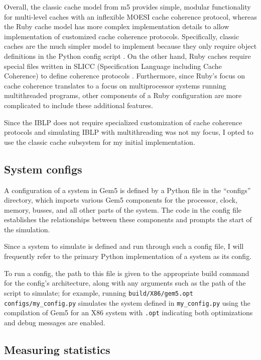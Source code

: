 \documentclass[12pt,twoside]{reedthesis}
\begin{document}
	Overall, the classic cache model from m5 provides simple, modular functionality for multi-level caches with an inflexible MOESI cache coherence protocol, whereas the Ruby cache model has more complex implementation details to allow implementation of customized cache coherence protocols. Specifically, classic caches are the much simpler model to implement because they only require object definitions in the Python config script \cite{gem5-tutorial}. On the other hand, Ruby caches require special files written in SLICC (Specification Language including Cache Coherence) to define coherence protocols \cite{gem5-ruby}. Furthermore, since Ruby's focus on cache coherence translates to a focus on multiprocessor systems running multithreaded programs, other components of a Ruby configuration are more complicated to include these additional features.

	Since the IBLP does not require specialized customization of cache coherence protocols and simulating IBLP with multithreading was not my focus, I opted to use the classic cache subsystem for my initial implementation.

	\subsection*{System configs}

	A configuration of a system in Gem5 is defined by a Python file in the ``configs'' directory, which imports various Gem5 components for the processor, clock, memory, busses, and all other parts of the system. The code in the config file establishes the relationships between these components and prompts the start of the simulation.

	Since a system to simulate is defined and run through such a config file, I will frequently refer to the primary Python implementation of a system as its config.

	To run a config, the path to this file is given to the appropriate build command for the config's architecture, along with any arguments such as the path of the script to simulate; for example, running \verb`build/X86/gem5.opt configs/my_config.py` simulates the system defined in \verb`my_config.py` using the compilation of Gem5 for an X86 system with \verb`.opt` indicating both optimizations and debug messages are enabled.

	\subsection*{Measuring statistics}
\end{document}
